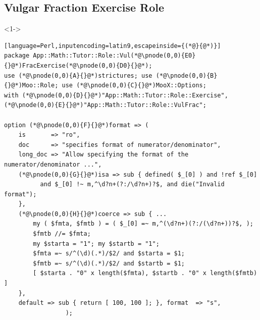 \documentclass[ngerman,xcolor={table,dvipsnames},smaller,compress,hyperref={bookmarks,colorlinks}]{beamer}
\begin{document}
\subsection{Vulgar Fraction Exercise Role}

\begin{frame}[t,fragile]

\begin{block}<1->{}
\scriptsize
\begin{lstlisting}[language=Perl,inputencoding=latin9,escapeinside={(*@}{@*)}]
package App::Math::Tutor::Role::Vul(*@\pnode(0,0){E0}{}@*)FracExercise(*@\pnode(0,0){D0}{}@*);
use (*@\pnode(0,0){A}{}@*)strictures; use (*@\pnode(0,0){B}{}@*)Moo::Role; use (*@\pnode(0,0){C}{}@*)MooX::Options;
with (*@\pnode(0,0){D}{}@*)"App::Math::Tutor::Role::Exercise", (*@\pnode(0,0){E}{}@*)"App::Math::Tutor::Role::VulFrac";

option (*@\pnode(0,0){F}{}@*)format => (
    is       => "ro",
    doc      => "specifies format of numerator/denominator",
    long_doc => "Allow specifying the format of the numerator/denominator ...",
    (*@\pnode(0,0){G}{}@*)isa => sub { defined( $_[0] ) and !ref $_[0]
          and $_[0] !~ m,^\d?n+(?:/\d?n+)?$, and die("Invalid format");
    },
    (*@\pnode(0,0){H}{}@*)coerce => sub { ...
        my ( $fmta, $fmtb ) = ( $_[0] =~ m,^(\d?n+)(?:/(\d?n+))?$, );
        $fmtb //= $fmta;
        my $starta = "1"; my $startb = "1";
        $fmta =~ s/^(\d)(.*)/$2/ and $starta = $1;
        $fmtb =~ s/^(\d)(.*)/$2/ and $startb = $1;
        [ $starta . "0" x length($fmta), $startb . "0" x length($fmtb) ]
    },
    default => sub { return [ 100, 100 ]; }, format  => "s",
                 );
\end{lstlisting}
\end{block}

\begin{itemize}
\end{itemize}
\end{frame}
\end{document}
